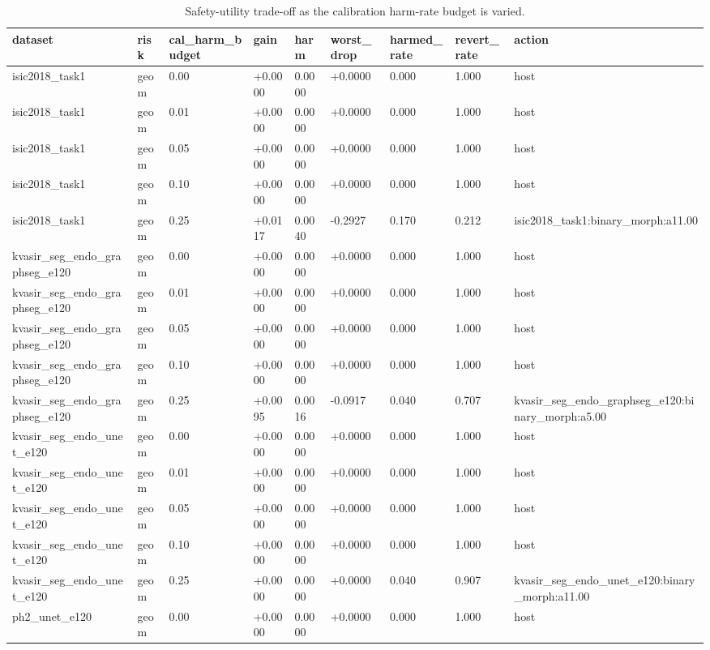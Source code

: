 \begin{table}[t]
\centering
\small
\caption{Safety-utility trade-off as the calibration harm-rate budget is varied.}
\label{tab:harm_budget_sweep}
\begin{tabular}{lllllllll}
\toprule
dataset & risk & cal\_harm\_budget & gain & harm & worst\_drop & harmed\_rate & revert\_rate & action \\
\midrule
isic2018\_task1 & geom & 0.00 & +0.0000 & 0.0000 & +0.0000 & 0.000 & 1.000 & host \\
isic2018\_task1 & geom & 0.01 & +0.0000 & 0.0000 & +0.0000 & 0.000 & 1.000 & host \\
isic2018\_task1 & geom & 0.05 & +0.0000 & 0.0000 & +0.0000 & 0.000 & 1.000 & host \\
isic2018\_task1 & geom & 0.10 & +0.0000 & 0.0000 & +0.0000 & 0.000 & 1.000 & host \\
isic2018\_task1 & geom & 0.25 & +0.0117 & 0.0040 & -0.2927 & 0.170 & 0.212 & isic2018\_task1:binary\_morph:a11.00 \\
kvasir\_seg\_endo\_graphseg\_e120 & geom & 0.00 & +0.0000 & 0.0000 & +0.0000 & 0.000 & 1.000 & host \\
kvasir\_seg\_endo\_graphseg\_e120 & geom & 0.01 & +0.0000 & 0.0000 & +0.0000 & 0.000 & 1.000 & host \\
kvasir\_seg\_endo\_graphseg\_e120 & geom & 0.05 & +0.0000 & 0.0000 & +0.0000 & 0.000 & 1.000 & host \\
kvasir\_seg\_endo\_graphseg\_e120 & geom & 0.10 & +0.0000 & 0.0000 & +0.0000 & 0.000 & 1.000 & host \\
kvasir\_seg\_endo\_graphseg\_e120 & geom & 0.25 & +0.0095 & 0.0016 & -0.0917 & 0.040 & 0.707 & kvasir\_seg\_endo\_graphseg\_e120:binary\_morph:a5.00 \\
kvasir\_seg\_endo\_unet\_e120 & geom & 0.00 & +0.0000 & 0.0000 & +0.0000 & 0.000 & 1.000 & host \\
kvasir\_seg\_endo\_unet\_e120 & geom & 0.01 & +0.0000 & 0.0000 & +0.0000 & 0.000 & 1.000 & host \\
kvasir\_seg\_endo\_unet\_e120 & geom & 0.05 & +0.0000 & 0.0000 & +0.0000 & 0.000 & 1.000 & host \\
kvasir\_seg\_endo\_unet\_e120 & geom & 0.10 & +0.0000 & 0.0000 & +0.0000 & 0.000 & 1.000 & host \\
kvasir\_seg\_endo\_unet\_e120 & geom & 0.25 & +0.0000 & 0.0000 & +0.0000 & 0.040 & 0.907 & kvasir\_seg\_endo\_unet\_e120:binary\_morph:a11.00 \\
ph2\_unet\_e120 & geom & 0.00 & +0.0000 & 0.0000 & +0.0000 & 0.000 & 1.000 & host \\

\end{tabular}
\end{table}
